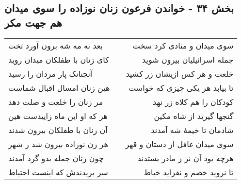 \begin{center}
\section*{بخش ۳۴ - خواندن فرعون زنان نوزاده را  سوی میدان هم جهت مکر}
\label{sec:sh034}
\begin{longtable}{l p{0.5cm} r}
بعد نه مه شه برون آورد تخت
&&
سوی میدان و منادی کرد سخت
\\
کای زنان با طفلکان میدان روید
&&
جمله اسرائیلیان بیرون شوید
\\
آنچنانک پار مردان را رسید
&&
خلعت و هر کس ازیشان زر کشید
\\
هین زنان امسال اقبال شماست
&&
تا بیابد هر یکی چیزی که خواست
\\
مر زنان را خلعت و صلت دهد
&&
کودکان را هم کلاه زر نهد
\\
هر که او این ماه زاییدست هین
&&
گنجها گیرید از شاه مکین
\\
آن زنان با طفلکان بیرون شدند
&&
شادمان تا خیمهٔ شه آمدند
\\
هر زن نوزاده بیرون شد ز شهر
&&
سوی میدان غافل از دستان و قهر
\\
چون زنان جمله بدو گرد آمدند
&&
هرچه بود آن نر ز مادر بستدند
\\
سر بریدندش که اینست احتیاط
&&
تا نروید خصم و نفزاید خباط
\\
\end{longtable}
\end{center}
